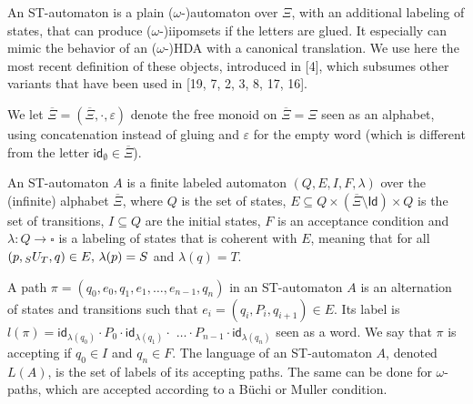 \documentclass[10pt,a4paper]{article}
\begin{document}
 
An ST-automaton is a plain ($\omega$-)automaton over $\Xi$, with an additional labeling of states, that can produce ($\omega$-)iipomsets if the letters are glued. It especially can mimic the behavior of an ($\omega$-)HDA with a canonical translation. We use here the most recent definition of these objects, introduced in [4], which subsumes other variants that have been used in [19, 7, 2, 3, 8, 17, 16].\par
 
 
 
We let $\overline{\Xi}=(\overline{\Xi},{\cdot},\varepsilon)$ denote the free monoid on $\overline{\Xi}=\Xi$ seen as an alphabet, using concatenation instead of gluing and $\varepsilon$ for the empty word (which is different from the letter $\mathsf{id}_{\emptyset}\in\overline{\Xi}$).\par
 
 
 
An ST-automaton $A$ is a finite labeled automaton $(Q,E,I,F,\lambda)$ over the (infinite) alphabet $\overline{\Xi}$, where $Q$ is the set of states, $E\subseteq Q\times(\overline{\Xi}\setminus\mathsf{Id})\times Q$ is the set of transitions, $I\subseteq Q$ are the initial states, $F$ is an acceptance condition and $\lambda:Q\rightarrow\square$ is a labeling of states that is coherent with $E$, meaning that for all $(p,{\vphantom{U}}_{S}U_{T},q)\in E,\,\lambda(p)=S$ and $\lambda(q)=T$.\par
 
 
 
A path $\pi=(q_{0},e_{0},q_{1},e_{1},\dots,e_{n-1},q_{n})$ in an ST-automaton $A$ is an alternation of states and transitions such that ${e_{i}=(q_{i},P_{i},q_{i+1})\in E}$. Its label is $l(\pi)=\mathsf{id}_{\lambda(q_{0})}\cdot P_{0}\cdot\mathsf{id}_{\lambda(q_{1})}\cdot$ $\ldots\cdot P_{n-1}\cdot\mathsf{id}_{\lambda(q_{n})}$ seen as a word. We say that $\pi$ is accepting if $q_{0}\in I$ and $q_{n}\in F$. The language of an ST-automaton $A$, denoted $L(A)$, is the set of labels of its accepting paths. The same can be done for $\omega$-paths, which are accepted according to a Büchi or Muller condition.\par
 
 
\end{document}
